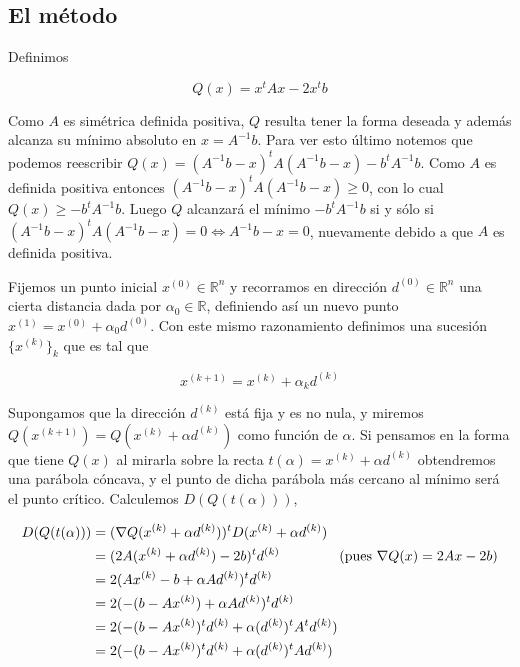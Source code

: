 \subsection{El método}

Definimos

\[Q(x) = x^tAx - 2x^tb\]

Como $A$ es simétrica definida positiva, $Q$ resulta tener la forma deseada y además alcanza su mínimo absoluto en $x = A^{-1}b$. Para ver esto último notemos que podemos reescribir $Q(x) = (A^{-1}b - x)^t A (A^{-1}b - x) - b^{t}A^{-1}b$. Como $A$ es definida positiva entonces $(A^{-1}b - x)^t A (A^{-1}b - x) \geq 0$, con lo cual $Q(x) \geq -b^t A^{-1}b$. Luego $Q$ alcanzará el mínimo $-b^t A^{-1}b$ si y sólo si $(A^{-1}b - x)^t A (A^{-1}b - x) = 0 \Leftrightarrow A^{-1}b - x = 0$, nuevamente debido a que $A$ es definida positiva.

Fijemos un punto inicial $x^{(0)} \in \mathbb{R}^n$ y recorramos en dirección $d^{(0)} \in \mathbb{R}^n$ una cierta distancia dada por $\alpha_0 \in \mathbb{R}$, definiendo así un nuevo punto $x^{(1)} = x^{(0)} + \alpha_0 d^{(0)}$. Con este mismo razonamiento definimos una sucesión $\{x^{(k)}\}_k$ que es tal que

\[x^{(k + 1)} = x^{(k)} + \alpha_{k}d^{(k)}\]

Supongamos que la dirección $d^{(k)}$ está fija y es no nula, y miremos $Q(x^{(k + 1)}) = Q(x^{(k)} + \alpha d^{(k)})$ como función de $\alpha$. Si pensamos en la forma que tiene $Q(x)$ al mirarla sobre la recta $t(\alpha) = x^{(k)} + \alpha d^{(k)}$ obtendremos una parábola cóncava, y el punto de dicha parábola más cercano al mínimo será el punto crítico. Calculemos $D(Q(t(\alpha)))$,

\begin{align*}
D(Q(t(\alpha))) &= (\nabla Q(x^{(k)} + \alpha d^{(k)}))^t D(x^{(k)} + \alpha d^{(k)})\\
				&= (2A(x^{(k)} + \alpha d^{(k)}) - 2b)^t d^{(k)} \hspace{1.5cm}\text{(pues }\nabla Q(x) = 2Ax - 2b\text{)}\\
				&= 2(Ax^{(k)} - b + \alpha A d^{(k)})^t d^{(k)}\\
				&= 2(-(b - Ax^{(k)}) + \alpha A d^{(k)})^t d^{(k)}\\
				&= 2(-(b - Ax^{(k)})^t d^{(k)} + \alpha (d^{(k)})^t A^t d^{(k)})\\
				&= 2(-(b - Ax^{(k)})^t d^{(k)} + \alpha (d^{(k)})^t A d^{(k)})
\end{align*}


